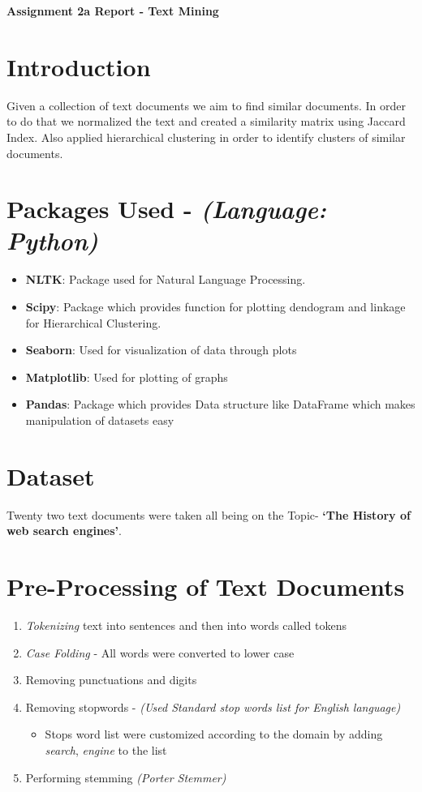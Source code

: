 \documentclass[7pt,a4paper]{article}
\begin{document}
\textbf{\LARGE Assignment 2a Report - Text Mining}
\section{Introduction}
Given a collection of text documents we aim to find similar documents. In order to do that we normalized the text and created a similarity matrix using Jaccard Index. Also applied hierarchical clustering in order to identify clusters of similar documents.

\section{Packages Used - \textit{(Language: Python)}}
\begin{itemize}
\item{\textbf{NLTK}: Package used for Natural Language Processing.}
\item{\textbf{Scipy}: Package which provides function for plotting dendogram and linkage for Hierarchical Clustering.}
\item{\textbf{Seaborn}: Used for visualization of data through plots}
\item{\textbf{Matplotlib}: Used for plotting of graphs}
\item{\textbf{Pandas}: Package which provides Data structure like DataFrame which makes
manipulation of datasets easy}
\end{itemize}

\section{Dataset}
Twenty two text documents were taken all being on the Topic- \textbf{‘The History of web search engines’}.

\section{Pre-Processing of Text Documents}
\begin{enumerate}
\item{\textit{Tokenizing} text into sentences and then into words called tokens}
\item{\textit{Case Folding} - All words were converted to lower case}
\item{Removing punctuations and digits}
\item{Removing stopwords - \textit{(Used Standard stop words list for English language)}}
\begin{itemize}
\item{Stops word list were customized according to the domain by adding \textit{search}, \textit{engine} to the list}
\end{itemize}
\item{Performing stemming \textit{(Porter Stemmer)}}
\end{enumerate}
\end{document}
